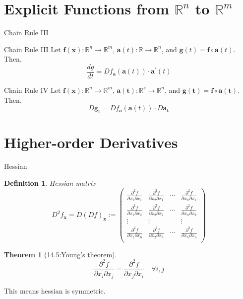 \documentclass[a4paper,11pt]{article}
\newtheorem{defn}{Definition}
\newtheorem{thm}{Theorem}
\newcommand{\bb}{\mathbb}
\newcommand{\bd}{\mathbf}
\newcommand{\p}{\partial}
\begin{document}
\section{Explicit Functions from $\mathbb{R}^n$ to $\mathbb{R}^m$} %
\label{sec:explicit_functions_from_mathbb_r_n_to_mathbb_r_m}
\begin{frame}[t]{Chain Rule III}
	\begin{block}
		{Chain Rule III}
		Let $\bd f(\bd x): \bb{R}^n\rightarrow \bb{R}^m$, $\bd a(t):\bb{R}\rightarrow\bb{R}^n$, and $\bd g(t) = \bd f \circ \bd a (t)$. Then, \[
			\frac{dg}{dt} = Df_{\bd a}(\bd a(t))\cdot \bd a^\prime (t)
		\]
	\end{block}
	\begin{block}
		{Chain Rule IV}
		Let $\bd f(\bd x): \bb{R}^n\rightarrow \bb{R}^m$, $\bd a(\bd t ):\bb{R}^s\rightarrow\bb{R}^n$, and $\bd g(\bd t) = \bd f \circ \bd a (\bd t)$. Then, \[
			{D\bd g}_{\bd t} = {Df}_{\bd a} (\bd a(t))\cdot D\bd a_{\bd t}
		\]
	\end{block}
\end{frame}
\section{Higher-order Derivatives} %
\label{sec:higher_order_derivatives}
\begin{frame}[t]{Hessian}
	\begin{defn}
		{Hessian matrix}\[
			D^2 f_{\bd x} = D(Df)_{\bd x}:=\begin{pmatrix}
				\frac{\p^2 f}{\p x_1 \p x_1} & \frac{\p^2 f}{\p x_2\p x_1} & \cdots & \frac{\p^2 f}{\p x_n \p x_1}\\
				\frac{\p^2 f}{\p x_1 \p x_2} & \frac{\p^2 f}{\p x_2\p x_2} & \cdots & \frac{\p^2 f}{\p x_n \p x_2}\\
				\vdots & \vdots & &\vdots\\
				\frac{\p^2 f}{\p x_1 \p x_n} & \frac{\p^2 f}{\p x_2\p x_n} & \cdots & \frac{\p^2 f}{\p x_n \p x_n}\\
			\end{pmatrix}
		\]
	\end{defn}
	\begin{thm}
		[14.5:Young's theorem]
		\[
			 \frac{\p^2 f}{\p x_i\p x_j} =  \frac{\p^2 f}{\p x_j\p x_i} \quad\forall i,j
		\]
	\end{thm}
	This means hessian is symmetric. 
\end{frame}
\end{document}
